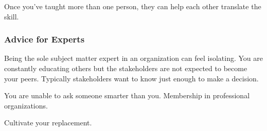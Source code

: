 Once you've taught more than one person, they can help each other translate the skill. 



\subsubsection*{Advice for Experts}

Being the sole subject matter expert in an organization can feel isolating. You are constantly educating others but the stakeholders are not expected to become your peers. Typically stakeholders want to know just enough to make a decision. 

You are unable to ask someone smarter than you. Membership in professional organizations.

Cultivate your replacement. 
